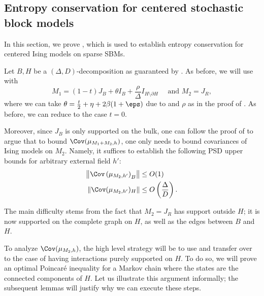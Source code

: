 \documentclass[11pt,letterpaper]{article}
\begin{document}
\subsection{Entropy conservation for centered stochastic block models}
\label{sec:centered-adjacency}

In this section, we prove , which is used to establish entropy conservation for centered Ising models on sparse SBMs.

\centeredadjacency*

Let $B,H$ be a $(\Delta, D)$-decomposition as guaranteed by .
As before, we will use  with 
\[
    M_1 = (1-t)J_B + \theta I_B + \frac{\rho}{\Delta} I_{H \setminus \partial H}  \quad \text{ and } M_2 = J_R,
\]
where we can take $\theta = \frac{t}{2} + \eta + 2\beta(1+\eps)$ due to  and $\rho$ as in the proof of .
As before, we can reduce to the case $t=0$. 

Moreover, since $J_B$ is only supported on the bulk, one can follow the proof of  to argue that to bound $\Cov(\mu_{M_1 + M_2, h})$, one only needs to bound covariances of Ising models on $M_2$. 
Namely, it suffices to establish the following PSD upper bounds for arbitrary external field $h'$:
\begin{align*}
    \left\| \Cov\left( \mu_{M_2,h'} \right)_B \right\| &\le O(1) \\
    \left\|\Cov(\mu_{M_2,h'})_H\right\| &\le O\left(\frac{\Delta}{D}\right).
\end{align*}

The main difficulty stems from the fact that $M_2 = J_R$ has support outside $H$; it is now supported on the complete graph on $H$, as well as the edges between $B$ and $H$.


To analyze $\Cov(\mu_{M_2, h})$, the high level strategy will be to use  and transfer over to the case of having interactions purely supported on $H$. 
To do so, we will prove an optimal Poincar\'{e} inequality for a Markov chain where the states are the connected components of $H$.
Let us illustrate this argument informally; the subsequent lemmas will justify why we can execute these steps.
\end{document}
